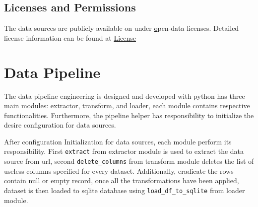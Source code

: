 \documentclass[a4paper,11pt]{article}
\begin{document}
    \subsection{Licenses and Permissions}
        The data sources are publicly available on under \href{https://catalog.data.gov//}open-data licenses. Detailed license information can be found at \href{https://resources.data.gov/open-licenses/}{License}
    
\section{Data Pipeline}
    The data pipeline engineering is designed and developed with python has three main modules: extractor, transform, and loader, each module contains respective functionalities. Furthermore, the pipeline helper has responsibility to initialize the desire configuration for data sources.

    After configuration Initialization for data sources, each module perform its responsibility. First \texttt{extract} from extractor module is used to extract the data source from url, second \texttt{delete\_columns} from transform module deletes the list of useless columns specified for every dataset. Additionally, eradicate the rows contain null or empty record, once all the transformations have been applied, dataset is then loaded to sqlite database using \texttt{load\_df\_to\_sqlite} from loader module.
\end{document}
